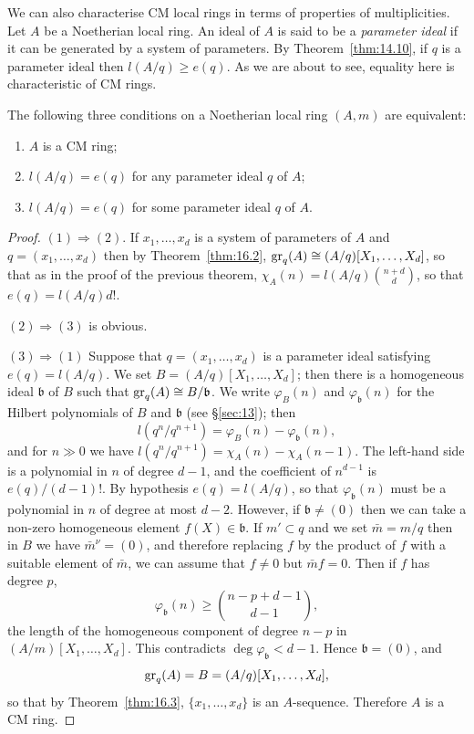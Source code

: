 We can also characterise CM local rings in terms of properties of
multiplicities. Let $A$ be a Noetherian local ring. An ideal of $A$ is said to
be a \emph{parameter ideal} if it can be generated by a system of parameters. By
Theorem~\ref{thm:14.10}, if $q$ is a parameter ideal then $l(A/q) \ge e(q)$. As we are about
to see, equality here is characteristic of CM rings.

\begin{theorem}\label{thm:17.11}
The following three conditions on a Noetherian local ring
$(A, m)$ are equivalent:
\begin{enumerate}[(1)]
  \item $A$ is a CM ring;
  \item $l(A/q) = e(q)$ for any parameter ideal $q$ of $A$;
  \item $l(A/q) = e(q)$ for some parameter ideal $q$ of $A$.
\end{enumerate}
\end{theorem}

\begin{proof}
$(1) \Rightarrow (2)$. If $x_1, \ldots, x_d$ is a system of parameters of $A$ and $q =
(x_1, \ldots, x_d)$ then by Theorem~\ref{thm:16.2}, $\operatorname{gr}_q(A) \cong (A/q)[X_1, \ldots, X_d]$, so that
as in the proof of the previous theorem, $\chi_A(n) = l(A/q)\binom{n+d}{d}$, so that
$e(q) = l(A/q)d!$.

$(2) \Rightarrow (3)$ is obvious.

$(3) \Rightarrow (1)$ Suppose that $q = (x_1, \ldots, x_d)$ is a parameter ideal satisfying
$e(q) = l(A/q)$. We set $B = (A/q)[X_1, \ldots, X_d]$; then there is a homogeneous
ideal $\mathfrak{b}$ of $B$ such that $\operatorname{gr}_q(A) \cong B/\mathfrak{b}$. We write $\varphi_B(n)$ and $\varphi_{\mathfrak{b}}(n)$ for the Hilbert
polynomials of $B$ and $\mathfrak{b}$ (see \S\ref{sec:13}); then
\[
  l(q^n/q^{n+1}) = \varphi_B(n) - \varphi_{\mathfrak{b}}(n),
\]
and for $n \gg 0$ we have $l(q^n/q^{n+1}) = \chi_A(n) - \chi_A(n-1)$. The left-hand side is a
polynomial in $n$ of degree $d - 1$, and the coefficient of $n^{d-1}$ is $e(q)/(d - 1)!$. By
hypothesis $e(q) = l(A/q)$, so that $\varphi_{\mathfrak{b}}(n)$ must be a polynomial in $n$ of degree at
most $d - 2$. However, if $\mathfrak{b} \neq (0)$ then we can take a non-zero homogeneous
element $f(X) \in \mathfrak{b}$. If $m' \subset q$ and we set $\bar{m} = m/q$ then in $B$ we have
$\bar{m}^\nu = (0)$, and therefore replacing $f$ by the product of $f$ with a suitable
element of $\bar{m}$, we can assume that $f \neq 0$ but $\bar{m}f = 0$. Then
if $f$ has degree $p$,
\[
  \varphi_{\mathfrak{b}}(n) \ge \binom{n-p+d-1}{d-1},
\]
the length of the homogeneous component of degree $n - p$ in $(A/m)[X_1, \ldots, X_d]$. This
contradicts $\deg \varphi_{\mathfrak{b}} < d - 1$. Hence $\mathfrak{b} = (0)$, and
\[
  \operatorname{gr}_q(A) = B = (A/q)[X_1, \ldots, X_d],
\]
so that by Theorem~\ref{thm:16.3}, $\{x_1, \ldots, x_d\}$ is an $A$-sequence. Therefore $A$ is a CM
ring.
\end{proof}

